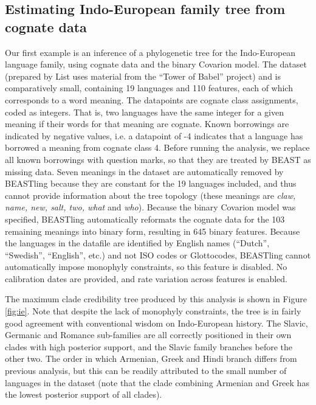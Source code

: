 \documentclass[twocolumn,10pt]{scrartcl}
\begin{document}
\subsection{Estimating Indo-European family tree from cognate data}

Our first example is an inference of a phylogenetic tree for the Indo-European language family, using cognate data and the binary Covarion model.  The dataset\cite{List2014a} (prepared by List\cite{List2014} uses material from the ``Tower of Babel'' project\cite{Starostin2008}) and is comparatively small, containing 19 languages and 110 features, each of which corresponds to a word meaning.  The datapoints are cognate class assignments, coded as integers.  That is, two languages have the same integer for a given meaning if their words for that meaning are cognate.  Known borrowings are indicated by negative values, i.e. a datapoint of -4 indicates that a language has borrowed a meaning from cognate class 4.  Before running the analysis, we replace all known borrowings with question marks, so that they are treated by BEAST as missing data.  Seven meanings in the dataset are automatically removed by BEASTling because they are constant for the 19 languages included, and thus cannot provide information about the tree topology (these meanings are \emph{claw, name, new, salt, two, what} and \emph{who}).  Because the binary Covarion model was specified, BEASTling automatically reformats the cognate data for the 103 remaining meanings into binary form, resulting in 645 binary features.  Because the languages in the datafile are identified by English names (``Dutch'', ``Swedish'', ``English'', etc.) and not ISO codes or Glottocodes, BEASTling cannot automatically impose monophyly constraints, so this feature is disabled.  No calibration dates are provided, and rate variation across features is enabled.

The maximum clade credibility tree produced by this analysis is shown in Figure \ref{fig:ie}.  Note that despite the lack of monophyly constraints, the tree is in fairly good agreement with conventional wisdom on Indo-European history.  The Slavic, Germanic and Romance sub-families are all correctly positioned in their own clades with high posterior support, and the Slavic family branches before the other two.  The order in which Armenian, Greek and Hindi branch differs from previous analysis\cite{Gray2003,Bouckaert2012}, but this can be readily attributed to the small number of languages in the dataset (note that the clade combining Armenian and Greek has the lowest posterior support of all clades).
\end{document}
